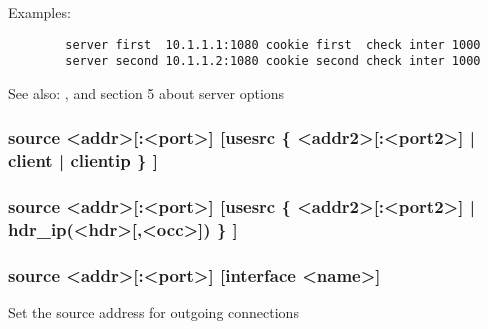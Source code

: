   Examples:
  \begin{verbatim}
        server first  10.1.1.1:1080 cookie first  check inter 1000
        server second 10.1.1.2:1080 cookie second check inter 1000
  \end{verbatim}

  See also: ,  and section 5 about
             server options

\subsubsection[source]{source <addr>[:<port>] [usesrc \{ <addr2>[:<port2>] | client | clientip \} ]}
\subsubsection*{source <addr>[:<port>] [usesrc \{ <addr2>[:<port2>] | hdr\_ip(<hdr>[,<occ>]) \} ]}
\subsubsection*{source <addr>[:<port>] [interface <name>]}


  Set the source address for outgoing connections


